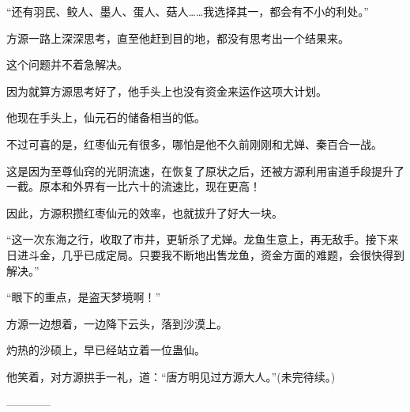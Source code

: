 \begin{this_body}
“还有羽民、鲛人、墨人、蛋人、菇人……我选择其一，都会有不小的利处。”

方源一路上深深思考，直至他赶到目的地，都没有思考出一个结果来。

这个问题并不着急解决。

因为就算方源思考好了，他手头上也没有资金来运作这项大计划。

他现在手头上，仙元石的储备相当的低。

不过可喜的是，红枣仙元有很多，哪怕是他不久前刚刚和尤婵、秦百合一战。

这是因为至尊仙窍的光阴流速，在恢复了原状之后，还被方源利用宙道手段提升了一截。原本和外界有一比六十的流速比，现在更高！

因此，方源积攒红枣仙元的效率，也就拔升了好大一块。

“这一次东海之行，收取了市井，更斩杀了尤婵。龙鱼生意上，再无敌手。接下来日进斗金，几乎已成定局。只要我不断地出售龙鱼，资金方面的难题，会很快得到解决。”

“眼下的重点，是盗天梦境啊！”

方源一边想着，一边降下云头，落到沙漠上。

灼热的沙硕上，早已经站立着一位蛊仙。

他笑着，对方源拱手一礼，道：“唐方明见过方源大人。”(未完待续。)

------------

\end{this_body}

